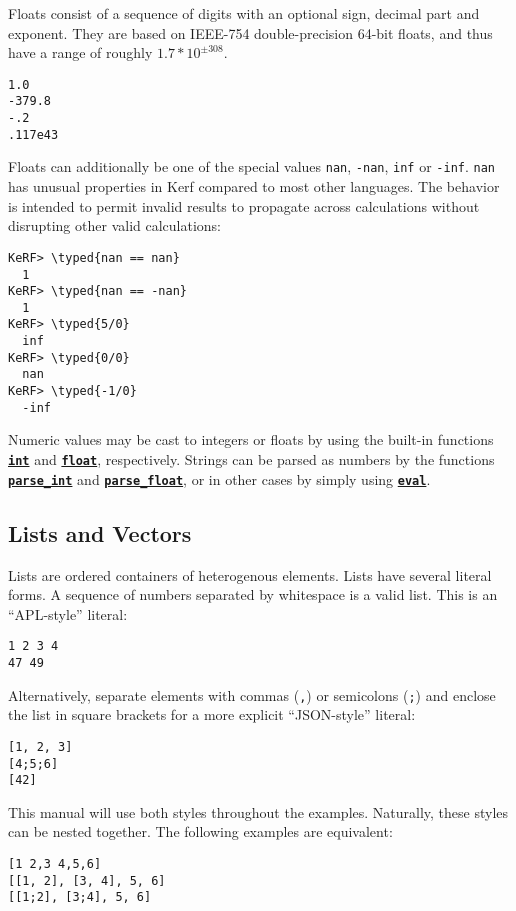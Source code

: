 \documentclass{article}
\newcommand{\typed}[1]{\textcolor{TealBlue}{#1}}
\newcommand{\primu}[2]{\hyperref[prim:#2]{\textbf{\texttt{#1}}}}
\newcommand{\prim}[1]{\primu{#1}{#1}}
\begin{document}
\vspace{0.5cm}

Floats consist of a sequence of digits with an optional sign, decimal part and exponent. They are based on IEEE-754 double-precision 64-bit floats, and thus have a range of roughly $1.7*10^{\pm308}$.
\begin{Verbatim}
1.0
-379.8
-.2
.117e43
\end{Verbatim}
Floats can additionally be one of the special values \texttt{nan}, \texttt{-nan}, \texttt{inf} or \texttt{-inf}. \texttt{nan} has unusual properties in Kerf compared to most other languages. The behavior is intended to permit invalid results to propagate across calculations without disrupting other valid calculations:
\begin{Verbatim}
KeRF> \typed{nan == nan}
  1
KeRF> \typed{nan == -nan}
  1
KeRF> \typed{5/0}
  inf
KeRF> \typed{0/0}
  nan
KeRF> \typed{-1/0}
  -inf
\end{Verbatim}

Numeric values may be cast to integers or floats by using the built-in functions \prim{int} and \prim{float}, respectively. Strings can be parsed as numbers by the functions \primu{parse\_int}{parseInt} and \primu{parse\_float}{parseFloat}, or in other cases by simply using \prim{eval}.

\pagebreak
\subsection{Lists and Vectors}
Lists are ordered containers of heterogenous elements. Lists have several literal forms. A sequence of numbers separated by whitespace is a valid list. This is an ``APL-style'' literal:
\begin{Verbatim}
1 2 3 4
47 49
\end{Verbatim}
Alternatively, separate elements with commas (\texttt{,}) or semicolons (\texttt{;}) and enclose the list in square brackets for a more explicit ``JSON-style'' literal:
\begin{Verbatim}
[1, 2, 3]
[4;5;6]
[42]
\end{Verbatim}
This manual will use both styles throughout the examples. Naturally, these styles can be nested together. The following examples are equivalent:
\begin{Verbatim}
[1 2,3 4,5,6]
[[1, 2], [3, 4], 5, 6]
[[1;2], [3;4], 5, 6]
\end{Verbatim}

\vspace{0.5cm}
\end{document}
